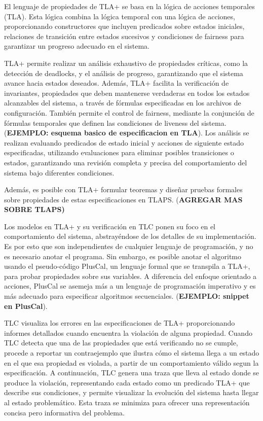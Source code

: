 \documentclass[runningheads]{llncs}
\begin{document}
El lenguaje de propiedades de TLA+ se basa en la lógica de acciones temporales (TLA). Esta lógica combina la lógica temporal con una lógica de acciones, proporcionando constructores que incluyen predicados sobre estados iniciales, relaciones de transición entre estados sucesivos y condiciones de fairness para garantizar un progreso adecuado en el sistema.

TLA+ permite realizar un análisis exhaustivo de propiedades críticas, como la detección de deadlocks, y el análisis de progreso, garantizando que el sistema avance hacia estados deseados. Además, TLA+ facilita la verificación de invariantes, propiedades que deben mantenerse verdaderas en todos los estados alcanzables del sistema, a través de fórmulas especificadas en los archivos de configuración. También permite el control de fairness, mediante la conjunción de fórmulas temporales que definen las condiciones de liveness del sistema. (\textbf{EJEMPLO: esquema basico de especificacion en TLA}). Los análisis se realizan evaluando predicados de estado inicial y acciones de siguiente estado especificadas, utilizando evaluaciones para eliminar posibles transiciones o estados, garantizando una revisión completa y precisa del comportamiento del sistema bajo diferentes condiciones. 

Además, es posible con TLA+ formular teoremas y diseñar pruebas formales sobre propiedades de estas especificaciones en TLAPS. (\textbf{AGREGAR MAS SOBRE TLAPS)}

Los modelos en TLA+ y su verificación en TLC ponen su foco en el comportamiento del sistema, abstrayéndose de los detalles de su implementación. Es por esto que son independientes de cualquier lenguaje de programación, y no es necesario anotar el programa. Sin embargo, es posible anotar el algoritmo usando el pseudo-código PlusCal, un lenguaje formal que se transpila a TLA+, para probar propiedades sobre sus variables. A diferencia del enfoque orientado a acciones, PlusCal se asemeja más a un lenguaje de programación imperativo y es más adecuado para especificar algoritmos secuenciales. (\textbf{EJEMPLO: snippet en PlusCal}).

TLC visualiza los errores en las especificaciones de TLA+ proporcionando informes detallados cuando encuentra la violación de alguna propiedad. Cuando TLC detecta que una de las propiedades que está verificando no se cumple, procede a reportar un contraejemplo que ilustra cómo el sistema llega a un estado en el que esa propiedad es violada, a partir de un comportamiento válido segun la especificación. A continuación, TLC genera una traza que lleva al estado donde se produce la violación, representando cada estado como un predicado TLA+ que describe sus condiciones, y permite visualizar la evolución del sistema hasta llegar al estado problemático. Esta traza se minimiza para ofrecer una representación concisa pero informativa del problema. 
\end{document}
